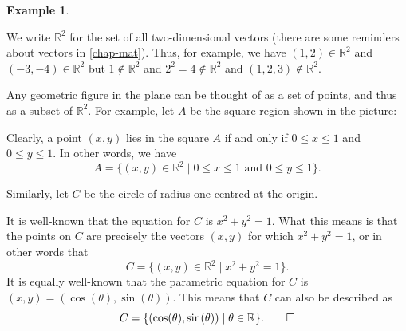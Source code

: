 \documentclass[a4paper]{book}
\newcommand{\R}         {{\mathbb{R}}}
\newcommand{\tht}       {\theta}
\newcommand{\st}        {\;|\;}
\renewcommand{\:}{\colon}
\newcommand{\bilabel}[1]{\hypertarget{#1}{\label{#1}}}
\theoremstyle{definition}
\newtheorem{example}[theorem]{Example}
\begin{document}
\begin{example}\bilabel{eg-R-two}
 We write $\R^2$ for the set of all two-dimensional vectors (there are
 some reminders about vectors in \autoref{chap-mat}).  Thus, for
 example, we have $(1,2)\in\R^2$ and $(-3,-4)\in\R^2$ but
 $1\not\in\R^2$ and $2^2=4\not\in\R^2$ and $(1,2,3)\not\in\R^2$.

 Any geometric figure in the plane can be thought of as a set of
 points, and thus as a subset of $\R^2$.  For example, let $A$ be the
 square region shown in the picture:
 \begin{center}
 \end{center}
 Clearly, a point $(x,y)$ lies in the square $A$ if and only if
 $0\leq x\leq 1$ and $0\leq y\leq 1$.  In other words, we have
 \[ A = \{(x,y)\in\R^2 \st 0\leq x\leq 1 \text{ and } 0\leq y\leq 1\}. \]

 Similarly, let $C$ be the circle of radius one centred at the
 origin.
 \begin{center}
 \end{center}
 It is well-known that the equation for $C$ is $x^2+y^2=1$.
 What this means is that the points on $C$ are precisely the vectors
 $(x,y)$ for which $x^2+y^2=1$, or in other words that
 \[ C = \{(x,y)\in\R^2\st x^2+y^2=1\}. \]
 It is equally well-known that the parametric equation for $C$ is
 $(x,y)=(\cos(\tht),\sin(\tht))$.  This means that $C$ can also be
 described as
 \[ C = \{(\cos(\tht),\sin(\tht)) \st \tht\in\R\}. \qed \]
\end{example}
\end{document}
